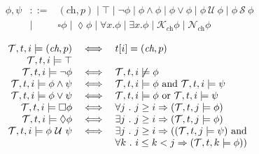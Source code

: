 \documentclass[conference]{IEEEtran}
\theoremstyle{definition}
\newcommand{\sch}{\textit{ch}}
\newcommand{\ltrue}{\ensuremath{\top}}
\newcommand{\xv}{p}
\newcommand{\tr}{t}
\newcommand{\tset}{\mathcal{T}}
\newcommand{\tnext}{\mathcal{X}}
\newcommand{\talways}{\square}
\newcommand{\tevent}{\lozenge}
\newcommand{\tuntil}{~\mathcal{U}~}
\newcommand{\tsince}{~\mathcal{S}~}
\newcommand{\tknows}[1]{\mathcal{K}_{#1}}
\newcommand{\tatmost}[1]{\mathcal{N}_{#1}}
\begin{document}
\begin{figure}[t]
  \begin{displaymath}
    \begin{array}{rcl}
      \phi, \psi & ::= &
      (\sch, \xv)
      \mid \top
      \mid \neg \phi
      \mid \phi \wedge \phi
      \mid \phi \vee \phi
      \mid \phi \tuntil \phi
      \mid \phi \tsince \phi
      \\
      & \mid & \talways \phi
      \mid \tevent \phi
      \mid \forall x . \phi
      \mid \exists x . \phi
      \mid \tknows{\sch} \phi
      \mid \tatmost{\sch} \phi
    \end{array}
  \end{displaymath}    

  \begin{displaymath}
    \begin{array}{rcl}
      \tset, \tr, i \models (\sch, \xv) & \iff &
      \tr[i] = (\sch, \xv) \\

      \tset, \tr, i \models \ltrue \\

      \tset, \tr, i \models \neg \phi & \iff &
      \tset, \tr, i \not \models \phi \\

      \tset, \tr, i \models \phi \land \psi & \iff &
      \tset, \tr, i \models \phi \hbox{ and } \tset, \tr, i \models \psi \\

      \tset, \tr, i \models \phi \lor \psi & \iff &
      \tset, \tr, i \models \phi \hbox{ or } \tset, \tr, i \models \psi \\


      \tset, \tr, i \models \talways \phi & \iff &
      \forall j ~.~ j \geq i \Rightarrow (\tset, \tr, j \models \phi) \\

      \tset, \tr, i \models \tevent \phi & \iff &
      \exists j ~.~ j \geq i \Rightarrow (\tset, \tr, j \models \phi) \\

      \tset, \tr, i \models \phi \tuntil \psi & \iff &
      \exists j ~.~ j \geq i \Rightarrow ((\tset, \tr, j \models \psi)
      \hbox{ and } \\
      & & \forall k ~.~ i \leq k < j \Rightarrow (\tset, \tr, k
      \models \phi)) \\


\end{array}
\end{displaymath}
\end{figure}
\end{document}
